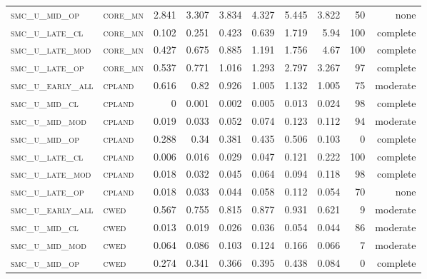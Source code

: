 \begin{landscape}
\begin{center}
\begin{footnotesize}
\begin{longtable}{llrrrrr|rrr}
\textsc{smc\_u\_mid\_op   } & \textsc{core\_mn  }   & 2.841    & 3.307    & 3.834    & 4.327    & 5.445    & 3.822    & 50  & none     \\
\textsc{smc\_u\_late\_cl  } & \textsc{core\_mn  }   & 0.102    & 0.251    & 0.423    & 0.639    & 1.719    & 5.94     & 100 & complete \\
\textsc{smc\_u\_late\_mod } & \textsc{core\_mn  }   & 0.427    & 0.675    & 0.885    & 1.191    & 1.756    & 4.67     & 100 & complete \\
\textsc{smc\_u\_late\_op  } & \textsc{core\_mn  }   & 0.537    & 0.771    & 1.016    & 1.293    & 2.797    & 3.267    & 97  & complete \\
\textsc{smc\_u\_early\_all} & \textsc{cpland    }   & 0.616    & 0.82     & 0.926    & 1.005    & 1.132    & 1.005    & 75  & moderate \\
\textsc{smc\_u\_mid\_cl   } & \textsc{cpland    }   & 0        & 0.001    & 0.002    & 0.005    & 0.013    & 0.024    & 98  & complete \\
\textsc{smc\_u\_mid\_mod  } & \textsc{cpland    }   & 0.019    & 0.033    & 0.052    & 0.074    & 0.123    & 0.112    & 94  & moderate \\
\textsc{smc\_u\_mid\_op   } & \textsc{cpland    }   & 0.288    & 0.34     & 0.381    & 0.435    & 0.506    & 0.103    & 0   & complete \\
\textsc{smc\_u\_late\_cl  } & \textsc{cpland    }   & 0.006    & 0.016    & 0.029    & 0.047    & 0.121    & 0.222    & 100 & complete \\
\textsc{smc\_u\_late\_mod } & \textsc{cpland    }   & 0.018    & 0.032    & 0.045    & 0.064    & 0.094    & 0.118    & 98  & complete \\
\textsc{smc\_u\_late\_op  } & \textsc{cpland    }   & 0.018    & 0.033    & 0.044    & 0.058    & 0.112    & 0.054    & 70  & none     \\
\textsc{smc\_u\_early\_all} & \textsc{cwed      }   & 0.567    & 0.755    & 0.815    & 0.877    & 0.931    & 0.621    & 9   & moderate \\
\textsc{smc\_u\_mid\_cl   } & \textsc{cwed      }   & 0.013    & 0.019    & 0.026    & 0.036    & 0.054    & 0.044    & 86  & moderate \\
\textsc{smc\_u\_mid\_mod  } & \textsc{cwed      }   & 0.064    & 0.086    & 0.103    & 0.124    & 0.166    & 0.066    & 7   & moderate \\
\textsc{smc\_u\_mid\_op   } & \textsc{cwed      }   & 0.274    & 0.341    & 0.366    & 0.395    & 0.438    & 0.084    & 0   & complete \\

\end{longtable}
\end{footnotesize}
\end{center}
\end{landscape}
